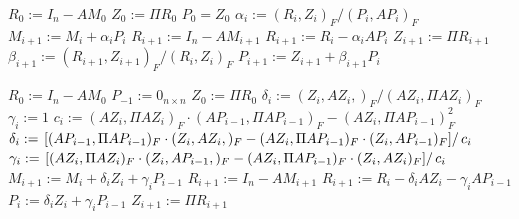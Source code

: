 \documentclass[numbers,webpdf,imanum]{ima-authoring-template}%
\theoremstyle{thmstyletwo}%
\numberwithin{equation}{section}
\begin{document}
\begin{algorithm}[ht]
\caption{CG($A$, $\Pi$, $M_0$, $\texttt{ExplicitResidualUpdate}$)}
\label{algo:pcg}
\begin{algorithmic}[1]
\Statex {}
\State $R_0:=I_n-AM_0$
\State $Z_0:=\Pi R_0$
\State $P_0=Z_0$
\State $\alpha_i:=(R_i,Z_i)_F/(P_i,AP_i)_F$
\State $M_{i+1}:=M_i+\alpha_i P_i$
\State $R_{i+1}:=I_n-AM_{i+1}$
\Else
\State $R_{i+1}:=R_i-\alpha_iAP_i$
\EndIf
\State $Z_{i+1}:=\Pi R_{i+1}$
\State $\beta_{i+1}:=(R_{i+1},Z_{i+1})_F/(R_i,Z_i)_F$
\State $P_{i+1}:=Z_{i+1}+\beta_{i+1} P_i$
\EndFor
\end{algorithmic}
\end{algorithm}

\begin{algorithm}[ht]
\caption{LOMR\_SPD($A$, $\Pi$, $M_0$, $\texttt{ExplicitResidualUpdate}$)}
\label{algo:lopmr}
\begin{algorithmic}[1]
\Statex {}
\State $R_0:=I_n-AM_0$
\State $P_{-1}:=0_{n\times n}$
\State $Z_0:=\Pi R_0$
\State $\delta_i:=(Z_i,AZ_i,)_F/(AZ_i,\Pi AZ_i)_F$
\State $\gamma_i:=1$
\Else
\State $c_i:=(AZ_i,\Pi AZ_i)_F\cdot(AP_{i-1},\Pi AP_{i-1})_F-(AZ_i,\Pi AP_{i-1})_F^2$
\State $\delta_i:=\left.\left[(AP_{i-1},\Pi AP_{i-1})_F\cdot(Z_i,AZ_i,)_F-(AZ_i,\Pi AP_{i-1})_F\cdot(Z_i,AP_{i-1})_F\right]\right/c_i$
\State $\gamma_i:=\left.\left[(AZ_i,\Pi AZ_i)_F\cdot(Z_i,AP_{i-1},)_F-(AZ_i,\Pi AP_{i-1})_F\cdot(Z_i,AZ_i)_F\right]\right/c_i$
\EndIf
\State $M_{i+1}:=M_i+\delta_iZ_i+\gamma_i P_{i-1}$
\State $R_{i+1}:=I_n-AM_{i+1}$
\Else
\State $R_{i+1}:=R_i-\delta_iAZ_i-\gamma_iAP_{i-1}$
\EndIf
\State $P_{i}:=\delta_i Z_{i}+\gamma_i P_{i-1}$
\State $Z_{i+1}:=\Pi R_{i+1}$
\EndFor
\end{algorithmic}
\end{algorithm}
\end{document}
